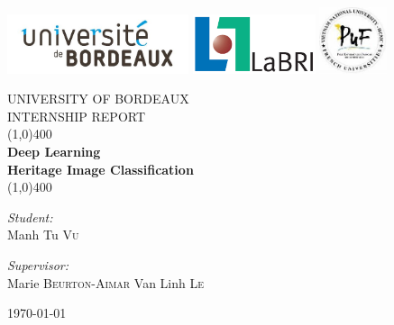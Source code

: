 \documentclass[hidelinks,12pt,a4paper]{report}
\title{}
\author{Tu \textsc{Vu}}
\date{\today}
\begin{document}
\begin{titlepage}
\includegraphics[height=1.75cm, valign=c]{images/bordeaux_logo.jpg}
\hspace*{0.3cm}\includegraphics[height=1.75cm, valign=c]{images/LaBRI_logo.jpg}
\hspace*{1.3cm}\includegraphics[height=1.95cm, valign=c]{images/puf_logo.jpg}\\[1.5cm]
		
	\begin{center}
	
	
	\textsc{\Large UNIVERSITY OF BORDEAUX}\\[1.5cm] %
	
	\textsc{\large INTERNSHIP REPORT}\\[1.5cm] %


	
	\line(1,0){400}\\[0.2in]
	\huge{\bfseries Deep Learning \\ Heritage Image Classification}\\
	\line(1,0){400}\\[1.5cm]
	\noindent	
	\begin{minipage}{0.4\textwidth}
		\begin{flushleft} \large
    	\emph{Student:}\\
    	Manh Tu \textsc{Vu}
		\end{flushleft}
	\end{minipage}
	\begin{minipage}{0.4\textwidth}
  		\begin{flushright} \large
    		\emph{Supervisor:} \\
    		Marie \textsc{Beurton-Aimar}
    		Van Linh \textsc{Le}
  		\end{flushright}
	\end{minipage}
	
	\vfill

{\large \today}
	\end{center}
\end{titlepage}
\end{document}
